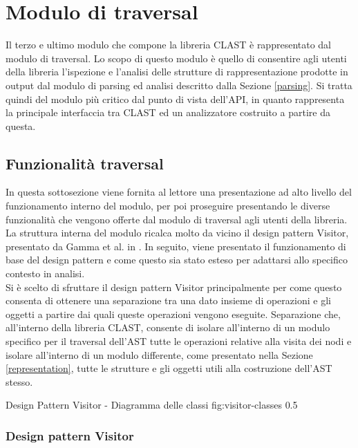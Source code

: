 \section{Modulo di traversal}
\label{traversal}

Il terzo e ultimo modulo che compone la libreria CLAST è rappresentato dal
modulo di traversal. Lo scopo di questo modulo è quello di consentire agli
utenti della libreria l'ispezione e l'analisi delle strutture di
rappresentazione prodotte in output dal modulo di parsing ed analisi descritto
dalla Sezione \ref{parsing}. Si tratta quindi del modulo più critico dal punto
di vista dell'API, in quanto rappresenta la principale interfaccia tra CLAST ed
un analizzatore costruito a partire da questa.

\subsection{Funzionalità traversal}

In questa sottosezione viene fornita al lettore una presentazione ad alto
livello del funzionamento interno del modulo, per poi proseguire presentando le
diverse funzionalità che vengono offerte dal modulo di traversal agli utenti
della libreria.\\

La struttura interna del modulo ricalca molto da vicino il design pattern
Visitor, presentato da Gamma et al. in \cite{gamma1995design}. In seguito, viene
presentato il funzionamento di base del design pattern e come questo sia stato
esteso per adattarsi allo specifico contesto in analisi.\\

Si è scelto di sfruttare il design pattern Visitor principalmente per come
questo consenta di ottenere una separazione tra una dato insieme di operazioni e
gli oggetti a partire dai quali queste operazioni vengono eseguite. Separazione
che, all'interno della libreria CLAST, consente di isolare all'interno di un
modulo specifico per il traversal dell'AST tutte le operazioni relative alla
visita dei nodi e isolare all'interno di un modulo differente, come presentato
nella Sezione \ref{representation}, tutte le strutture e gli oggetti utili alla
costruzione dell'AST stesso.

      {Design Pattern Visitor - Diagramma delle classi}
      {fig:visitor-classes}
      {0.5}

\subsubsection{Design pattern Visitor}

